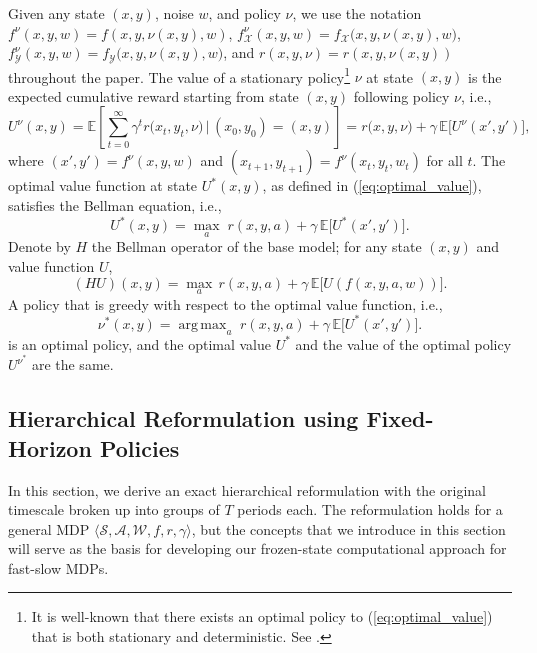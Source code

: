 \documentclass[11pt, notitlepage]{article}
\DeclareMathOperator*{\argmax}{arg\,max}
\newcommand{\E}{\mathbb{E}}
\newcommand{\1}{\mathbbm{1}}
\begin{document}
Given any state $(x,y)$, noise $w$, and policy $\nu$, we use the notation $f^\nu(x,y,w) = f(x,y,\nu(x,y), w)$, $f_\mathcal{X}^{\nu}(x,y,w) = f_\mathcal{X}\bigl(x,y,\nu(x,y),w\bigr)$, $f_\mathcal{Y}^{\nu}(x,y,w) = f_\mathcal{Y}\bigl(x,y,\nu(x,y),w\bigr)$, and $r(x,y,\nu) = r(x,y,\nu(x,y))$ throughout the paper.
The value of a stationary policy\footnote{It is well-known that there exists an optimal policy to (\ref{eq:optimal_value}) that is both stationary and deterministic. See \cite{puterman2014markov}.} $\nu$ at state $(x,y)$ is the expected cumulative reward starting from state $(x,y)$ following policy $\nu$, i.e., 
\begin{equation*}\label{eq.Bellman_original_policy}
    U^{\nu}(x,y) = \E \left[  \sum_{t=0}^{\infty} \gamma^t r\bigl(x_t,y_t,\nu \bigr) \, \Bigr| \, (x_0, y_0) = (x, y) \right] = r\bigl(x,y,\nu\bigr) + \gamma\, \E\bigl[U^{\nu}(x',y')\bigr],
\end{equation*}
where $(x', y') = f^\nu(x,y,w)$ and $(x_{t+1}, y_{t+1}) = f^{\nu}(x_t,y_t,w_t)$ for all $t$.
The optimal value function at state $U^*(x,y)$, as defined in (\ref{eq:optimal_value}), satisfies the Bellman equation, i.e., 
\begin{equation}\label{eq.Bellman_original}
    U^*(x,y) = \max_{a} \; r(x,y,a) + \gamma\, \E\bigl[U^*(x',y')\bigr].
\end{equation}
Denote by $H$ the Bellman operator of the base model; for any state $(x,y)$ and value function $U$,
\begin{equation} \label{eq.Vbase_operator}
    (H U) (x,y) = \max_{a} \, r(x,y,a) + \gamma \, \E \bigl[U(f(x,y,a,w))\bigr].
\end{equation}
A policy that is greedy with respect to the optimal value function, i.e., 
\[
\nu^*(x,y) = \argmax_{a} \; r(x,y,a) + \gamma \, \E \bigl[U^*(x',y')\bigr].
\]
is an optimal policy, and the optimal value $U^*$ and the value of the optimal policy $U^{\nu^*}$ are the same. 






\subsection{Hierarchical Reformulation using Fixed-Horizon Policies} \label{sec:original_groupT}
In this section, we derive an exact hierarchical reformulation with the original timescale broken up into groups of $T$ periods each. The reformulation holds for a general MDP $\langle \mathcal{S}, \mathcal{A}, \mathcal{W}, f, r, \gamma \rangle$, but the concepts that we introduce in this section will serve as the basis for developing our frozen-state computational approach for fast-slow MDPs.
\end{document}
